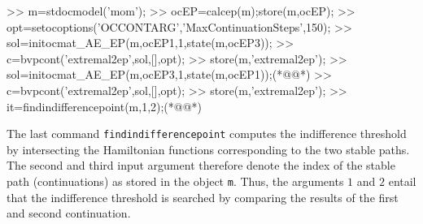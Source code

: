 \begin{matlab} 
>> m=stdocmodel('mom');
>> ocEP=calcep(m);store(m,ocEP);
>> opt=setocoptions('OCCONTARG','MaxContinuationSteps',150);
>> sol=initocmat_AE_EP(m,ocEP{1},1,state(m,ocEP{3}));
>> c=bvpcont('extremal2ep',sol,[],opt);
>> store(m,'extremal2ep');
>> sol=initocmat_AE_EP(m,ocEP{3},1,state(m,ocEP{1}));(*@@*)
>> c=bvpcont('extremal2ep',sol,[],opt);
>> store(m,'extremal2ep');
>> it=findindifferencepoint(m,1,2);(*@@*)
\end{matlab}
The last command \lstinline+findindifferencepoint+ computes the indifference threshold by intersecting the Hamiltonian functions corresponding to the two stable paths. The second and third input argument therefore denote the index of the stable path (continuations) as stored in the object \lstinline+m+. Thus, the arguments $1$ and $2$ entail that the indifference threshold is searched by comparing the results of the first and second continuation.

